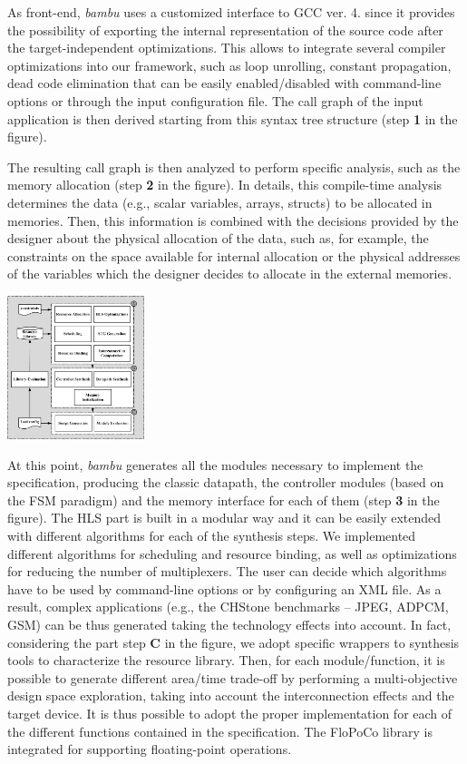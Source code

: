 As front-\/end, {\itshape bambu} uses a customized interface to G\+CC ver. 4. since it provides the possibility of exporting the internal representation of the source code after the target-\/independent optimizations. This allows to integrate several compiler optimizations into our framework, such as loop unrolling, constant propagation, dead code elimination that can be easily enabled/disabled with command-\/line options or through the input configuration file. The call graph of the input application is then derived starting from this syntax tree structure (step {\bfseries 1} in the figure).

The resulting call graph is then analyzed to perform specific analysis, such as the memory allocation (step {\bfseries 2} in the figure). In details, this compile-\/time analysis determines the data (e.\+g., scalar variables, arrays, structs) to be allocated in memories. Then, this information is combined with the decisions provided by the designer about the physical allocation of the data, such as, for example, the constraints on the space available for internal allocation or the physical addresses of the variables which the designer decides to allocate in the external memories.

 
\begin{DoxyImage}
\includegraphics[width=4cm]{hls_flow.png}
\end{DoxyImage}


At this point, {\itshape bambu} generates all the modules necessary to implement the specification, producing the classic datapath, the controller modules (based on the F\+SM paradigm) and the memory interface for each of them (step {\bfseries 3} in the figure). The H\+LS part is built in a modular way and it can be easily extended with different algorithms for each of the synthesis steps. We implemented different algorithms for scheduling and resource binding, as well as optimizations for reducing the number of multiplexers. The user can decide which algorithms have to be used by command-\/line options or by configuring an X\+ML file. As a result, complex applications (e.\+g., the C\+H\+Stone benchmarks -- J\+P\+EG, A\+D\+P\+CM, G\+SM) can be thus generated taking the technology effects into account. In fact, considering the part step {\bfseries C} in the figure, we adopt specific wrappers to synthesis tools to characterize the resource library. Then, for each module/function, it is possible to generate different area/time trade-\/off by performing a multi-\/objective design space exploration, taking into account the interconnection effects and the target device. It is thus possible to adopt the proper implementation for each of the different functions contained in the specification. The Flo\+Po\+Co library is integrated for supporting floating-\/point operations.

